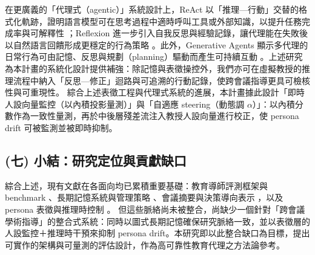 在更廣義的「代理式（agentic）」系統設計上，ReAct 以「推理—行動」交替的格式化軌跡，證明語言模型可在思考過程中適時呼叫工具或外部知識，以提升任務完成率與可解釋性 \citep{Yao2023ReAct}；Reflexion 進一步引入自我反思與經驗記錄，讓代理能在失敗後以自然語言回饋形成更穩定的行為策略 \citep{Shinn2023Reflexion}。此外，Generative Agents 顯示多代理的日常行為可由記憶、反思與規劃（planning）驅動而產生可持續互動 \citep{Park2023Generative}。上述研究為本計畫的系統化設計提供補強：除記憶與表徵操控外，我們亦可在虛擬教授的推理流程中納入「反思—修正」迴路與可追溯的行動記錄，使跨會議指導更具可檢核性與可重現性。
綜合上述表徵工程與代理式系統的進展，本計畫據此設計「即時人設向量監控（以內積投影量測）」與「自適應 steering（動態調 $\alpha$）」：以內積分數作為一致性量測，再於中後層殘差流注入教授人設向量進行校正，使 persona drift 可被監測並被即時抑制。

\subsection*{(七) 小結：研究定位與貢獻缺口}
綜合上述，現有文獻在各面向均已累積重要基礎：教育導師評測框架與 benchmark \citep{maurya-etal-2025-unifying,a2510_02663v1_tutorbench,a2601_21375v1_teachbench}、長期記憶系統與管理策略 \citep{a2305_10250v3_memorybank,a2310_08560v2_memgpt,a2504_19413v1_mem0}、會議摘要與決策導向表示 \citep{liu2025agendaaware_meetingsum,laskar-etal-2023-building}，以及 persona 表徵與推理時控制 \citep{a2507_21509v3_personavectors,turner-etal-2023-activation-addition,wehner-etal-2025-representation-engineering}。
但這些脈絡尚未被整合，尚缺少一個針對「跨會議學術指導」的整合式系統：同時以圖式長期記憶確保研究脈絡一致，並以表徵層的人設監控＋推理時干預來抑制 persona drift。本研究即以此整合缺口為目標，提出可實作的架構與可量測的評估設計，作為高可靠性教育代理之方法論參考。